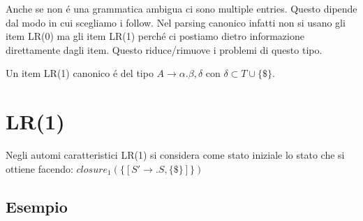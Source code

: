 Anche se non \'e una grammatica ambigua ci sono multiple entries. Questo dipende dal modo in cui scegliamo i follow. 
Nel parsing canonico infatti non si usano gli item LR(0) ma gli item LR(1) perch\'e ci postiamo dietro informazione direttamente
dagli item. Questo riduce/rimuove i problemi di questo tipo.

Un item LR(1) canonico \'e del tipo $A \rightarrow \alpha . \beta, \delta$ con $\delta \subset T \cup \{ \$ \}$.\\

\section{LR(1)}
Negli automi caratteristici LR(1) si considera come stato iniziale lo stato che si ottiene facendo: 
$closure_1 (\{[ S' \rightarrow .S, \{ \$\}  ]\})$

\subsection{Esempio}
